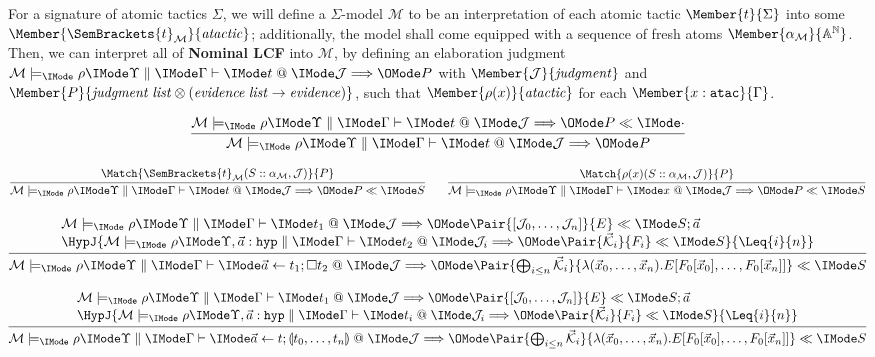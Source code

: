 For a signature of atomic tactics $\Sigma$, we will define a $\Sigma$-model
$\mathcal{M}$ to be an interpretation of each atomic tactic
$\Member{t}{\Sigma}$ into some
$\Member{\SemBrackets{t}_\mathcal{M}}{\LCFAtomicTactic}$; additionally, the
model shall come equipped with a sequence of fresh atoms
$\Member{\alpha_\mathcal{M}}{\MLStream{\MLAtom}}$. Then, we can interpret all
of \textbf{Nominal LCF} into $\mathcal{M}$, by defining an elaboration judgment
$\LCFElab{\Upsilon}{\Gamma}{t}{\mathcal{J}}{P}$ with $\Member{\mathcal{J}}{\LCFJudgment}$ and
$\Member{P}{\MLList{\LCFJudgment}\otimes(\MLList{\LCFEvidence}\to\LCFEvidence)}$,
such that $\Member{\rho(x)}{\LCFAtomicTactic}$ for each
$\Member{x:\SortATac}{\Gamma}$.

\[
  \infer{
    \LCFElab{\Upsilon}{\Gamma}{t}{\mathcal{J}}{P}
  }{
    \LCFElabSt{\Upsilon}{\Gamma}{t}{\mathcal{J}}{P}{\cdot}
  }
\]


\[
  \infer{
    \LCFElabSt{\Upsilon}{\Gamma}{t}{\mathcal{J}}{P}{S}
  }{
    \Match{
      \SemBrackets{t}_\mathcal{M}(S::\alpha_\mathcal{M},\mathcal{J})
    }{
      P
    }
  }
  \qquad
  \infer{
    \LCFElabSt{\Upsilon}{\Gamma}{x}{\mathcal{J}}{P}{S}
  }{
    \Match{
      \rho(x)(S::\alpha_\mathcal{M},\mathcal{J})
    }{
      P
    }
  }
\]

\[
  \infer{
    \LCFElabSt{\Upsilon}{\Gamma}{
      \TacSeq{t_1}{\vec{a}}{\Box t_2}
    }{\mathcal{J}}{
      \Pair{
        \bigoplus_{i\leq n}\vec{\mathcal{K}}_i
      }{
        \lambda(\vec{x}_0,\dots,\vec{x}_n). E[F_0[\vec{x}_0], \dots, F_0[\vec{x}_n]]
      }
    }{S}
  }{
    \begin{array}{l}
      \LCFElabSt{\Upsilon}{\Gamma}{t_1}{\mathcal{J}}{
        \Pair{[\mathcal{J}_0,\dots,\mathcal{J}_n]}{E}
      }{S;\vec{a}}\\
      \HypJ{
        \LCFElabSt{\Upsilon,\vec{a}:\SortHyp}{\Gamma}{t_2}{\mathcal{J}_i}{
          \Pair{\vec{\mathcal{K}}_i}{F_i}
        }{S}
      }{
        \Leq{i}{n}
      }
    \end{array}
  }
\]

\[
  \infer{
    \LCFElabSt{\Upsilon}{\Gamma}{
      \TacSeq{t}{\vec{a}}{\TacEach{t_0,\dots,t_n}}
    }{\mathcal{J}}{
      \Pair{
        \bigoplus_{i\leq n}\vec{\mathcal{K}}_i
      }{
        \lambda(\vec{x}_0,\dots,\vec{x}_n). E[F_0[\vec{x}_0], \dots, F_0[\vec{x}_n]]
      }
    }{S}
  }{
    \begin{array}{l}
      \LCFElabSt{\Upsilon}{\Gamma}{t_1}{\mathcal{J}}{
        \Pair{[\mathcal{J}_0,\dots,\mathcal{J}_n]}{E}
      }{S;\vec{a}}\\
      \HypJ{
        \LCFElabSt{\Upsilon,\vec{a}:\SortHyp}{\Gamma}{t_i}{\mathcal{J}_i}{
          \Pair{\vec{\mathcal{K}}_i}{F_i}
        }{S}
      }{
        \Leq{i}{n}
      }
    \end{array}
  }
\]

